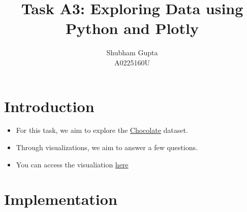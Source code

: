 \documentclass[a4paper]{article}
\title{Task A3: Exploring Data using Python and Plotly}
\author{Shubham Gupta \\ A0225160U}
\begin{document}
\maketitle
\section{Introduction}
\begin{itemize}
    \item For this task, we aim to explore the \href{https://github.com/rfordatascience/tidytuesday/tree/master/data/2022/2022-01-18}{Chocolate} dataset. 
    \item Through visualizations, we aim to answer a few questions.
    \item You can access the visualiation \href{https://nbviewer.org/github/goodhamgupta/cs5346_task_A3/blob/main/A0225160U_A3.ipynb}{here}
\end{itemize}

\section{Implementation}
\end{document}
